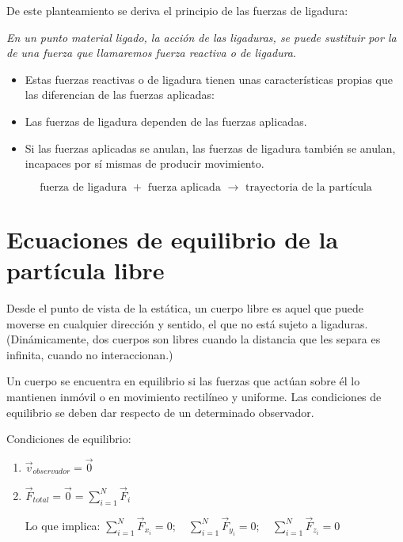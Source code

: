 De este planteamiento se deriva el principio de las fuerzas de ligadura: 

\emph{En un punto material ligado, la acción de las ligaduras,  se puede sustituir por la de una fuerza que llamaremos fuerza reactiva o de ligadura}. 

\begin{itemize}
\item Estas fuerzas reactivas o de ligadura tienen unas características propias que las diferencian de las fuerzas aplicadas: 
\item Las fuerzas de ligadura dependen de las fuerzas aplicadas. 
\item Si las fuerzas aplicadas se anulan, las fuerzas de ligadura también se anulan, incapaces por sí mismas de producir movimiento. 
\end{itemize}

\vspace{-5mm} %
$$\text{fuerza de ligadura } + \text{ fuerza aplicada }\to \text{ trayectoria de la partícula}$$



\section[Ecuaciones de equilibrio de la partícula libre]{Ecuaciones de equilibrio de la partícula libre}

Desde el punto de vista de la estática, un cuerpo libre es aquel que puede moverse en cualquier dirección y sentido, el que no está sujeto a ligaduras. (Dinámicamente, dos cuerpos son libres cuando la distancia que les separa es infinita, cuando no interaccionan.)

Un cuerpo se encuentra en equilibrio si las fuerzas que actúan sobre él lo mantienen inmóvil o en movimiento rectilíneo y uniforme. Las condiciones de equilibrio se deben dar respecto de un determinado observador.

Condiciones de equilibrio:
\begin{enumerate}
\item $\vec v_{observador}=\vec 0$
\item $\displaystyle \overrightarrow{F}_{total}=\vec 0=\sum_{i=1}^N \vec F_i$	

Lo que implica: $\displaystyle \sum_{i=1}^N \vec F_{x_i}=0;\quad \sum_{i=1}^N \vec F_{y_i}=0;\quad \sum_{i=1}^N \vec F_{z_i}=0$
\end{enumerate}


